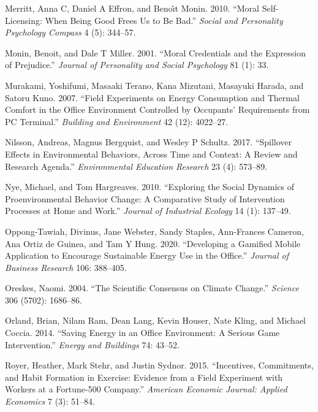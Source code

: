 \documentclass[
  11pt,
  captions=heading]{scrreport}
\newlength{\cslhangindent}
\newlength{\cslentryspacingunit} %
\newenvironment{CSLReferences}[2] %
 {%
  \setlength{\parindent}{0pt}
  \ifodd #1
  \let\oldpar\par
  \def\par{\hangindent=\cslhangindent\oldpar}
  \fi
  \setlength{\parskip}{#2\cslentryspacingunit}
 }%
 {}
\begin{document}
\begin{CSLReferences}{1}{0}
\leavevmode{}%
Merritt, Anna C, Daniel A Effron, and Benoı̂t Monin. 2010. {``Moral
Self-Licensing: When Being Good Frees Us to Be Bad.''} \emph{Social and
Personality Psychology Compass} 4 (5): 344--57.

\leavevmode{}%
Monin, Benoit, and Dale T Miller. 2001. {``Moral Credentials and the
Expression of Prejudice.''} \emph{Journal of Personality and Social
Psychology} 81 (1): 33.

\leavevmode{}%
Murakami, Yoshifumi, Masaaki Terano, Kana Mizutani, Masayuki Harada, and
Satoru Kuno. 2007. {``Field Experiments on Energy Consumption and
Thermal Comfort in the Office Environment Controlled by Occupants'
Requirements from PC Terminal.''} \emph{Building and Environment} 42
(12): 4022--27.

\leavevmode{}%
Nilsson, Andreas, Magnus Bergquist, and Wesley P Schultz. 2017.
{``Spillover Effects in Environmental Behaviors, Across Time and
Context: A Review and Research Agenda.''} \emph{Environmental Education
Research} 23 (4): 573--89.

\leavevmode{}%
Nye, Michael, and Tom Hargreaves. 2010. {``Exploring the Social Dynamics
of Proenvironmental Behavior Change: A Comparative Study of Intervention
Processes at Home and Work.''} \emph{Journal of Industrial Ecology} 14
(1): 137--49.

\leavevmode{}%
Oppong-Tawiah, Divinus, Jane Webster, Sandy Staples, Ann-Frances
Cameron, Ana Ortiz de Guinea, and Tam Y Hung. 2020. {``Developing a
Gamified Mobile Application to Encourage Sustainable Energy Use in the
Office.''} \emph{Journal of Business Research} 106: 388--405.

\leavevmode{}%
Oreskes, Naomi. 2004. {``The Scientific Consensus on Climate Change.''}
\emph{Science} 306 (5702): 1686--86.

\leavevmode{}%
Orland, Brian, Nilam Ram, Dean Lang, Kevin Houser, Nate Kling, and
Michael Coccia. 2014. {``Saving Energy in an Office Environment: A
Serious Game Intervention.''} \emph{Energy and Buildings} 74: 43--52.

\leavevmode{}%
Royer, Heather, Mark Stehr, and Justin Sydnor. 2015. {``Incentives,
Commitments, and Habit Formation in Exercise: Evidence from a Field
Experiment with Workers at a Fortune-500 Company.''} \emph{American
Economic Journal: Applied Economics} 7 (3): 51--84.


\end{CSLReferences}
\end{document}
